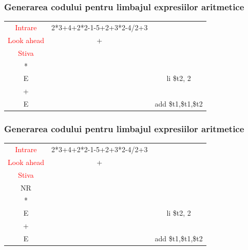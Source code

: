\documentclass[pdf]{beamer}
\begin{document}
\begin{frame}
\frametitle{Generarea codului pentru limbajul expresiilor aritmetice}
\begin{center}
\begin{tabular}{cc|c|} \cline{1-2}
\multicolumn{1}{|c|}{\textcolor{red}{Intrare}} & {2*3+4+2*2-1-5+2+3*2-4/2+3} \\ \cline{1-2}
\multicolumn{1}{|c|}{\textcolor{red}{Look ahead}} & + \\ \cline{1-2}
\multicolumn{1}{|c|}{\textcolor{red}{Stiva}}  \\
\cline{1-1} \cline{3-3}
\multicolumn{1}{|c|}{*} & & {}\\
\cline{1-1} \cline{3-3}
\multicolumn{1}{|c|}{E} & & {li \quad \$t2, 2}\\
\cline{1-1} \cline{3-3}
\multicolumn{1}{|c|}{+} & & {}\\
\cline{1-1} \cline{3-3}
\multicolumn{1}{|c|}{E} & & {add \quad \$t1,\$t1,\$t2}\\
\cline{1-1} \cline{3-3}
\end{tabular}
\end{center}
\end{frame}



\begin{frame}
\frametitle{Generarea codului pentru limbajul expresiilor aritmetice}
\begin{center}
\begin{tabular}{cc|c|} \cline{1-2}
\multicolumn{1}{|c|}{\textcolor{red}{Intrare}} & {2*3+4+2*2-1-5+2+3*2-4/2+3} \\ \cline{1-2}
\multicolumn{1}{|c|}{\textcolor{red}{Look ahead}} & + \\ \cline{1-2}
\multicolumn{1}{|c|}{\textcolor{red}{Stiva}}  \\
\cline{1-1} \cline{3-3}
\multicolumn{1}{|c|}{NR} & & {}\\
\cline{1-1} \cline{3-3}
\multicolumn{1}{|c|}{*} & & {}\\
\cline{1-1} \cline{3-3}
\multicolumn{1}{|c|}{E} & & {li \quad \$t2, 2}\\
\cline{1-1} \cline{3-3}
\multicolumn{1}{|c|}{+} & & {}\\
\cline{1-1} \cline{3-3}
\multicolumn{1}{|c|}{E} & & {add \quad \$t1,\$t1,\$t2}\\
\cline{1-1} \cline{3-3}
\end{tabular}
\end{center}
\end{frame}
\end{document}
